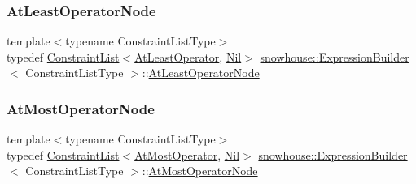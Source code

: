 \mbox{\label{structsnowhouse_1_1ExpressionBuilder_aaf839b9ebd0daa72220cc48bfaaea83f}} 
\subsubsection{\texorpdfstring{AtLeastOperatorNode}{AtLeastOperatorNode}}
{\footnotesize\ttfamily template$<$typename Constraint\+List\+Type$>$ \\
typedef \mbox{\hyperlink{structsnowhouse_1_1ConstraintList}{Constraint\+List}}$<$\mbox{\hyperlink{structsnowhouse_1_1AtLeastOperator}{At\+Least\+Operator}}, \mbox{\hyperlink{structsnowhouse_1_1Nil}{Nil}}$>$ \mbox{\hyperlink{structsnowhouse_1_1ExpressionBuilder}{snowhouse\+::\+Expression\+Builder}}$<$ Constraint\+List\+Type $>$\+::\mbox{\hyperlink{structsnowhouse_1_1ExpressionBuilder_aaf839b9ebd0daa72220cc48bfaaea83f}{At\+Least\+Operator\+Node}}}

\mbox{\label{structsnowhouse_1_1ExpressionBuilder_a41e14d33809a425326ef459325569442}} 
\subsubsection{\texorpdfstring{AtMostOperatorNode}{AtMostOperatorNode}}
{\footnotesize\ttfamily template$<$typename Constraint\+List\+Type$>$ \\
typedef \mbox{\hyperlink{structsnowhouse_1_1ConstraintList}{Constraint\+List}}$<$\mbox{\hyperlink{structsnowhouse_1_1AtMostOperator}{At\+Most\+Operator}}, \mbox{\hyperlink{structsnowhouse_1_1Nil}{Nil}}$>$ \mbox{\hyperlink{structsnowhouse_1_1ExpressionBuilder}{snowhouse\+::\+Expression\+Builder}}$<$ Constraint\+List\+Type $>$\+::\mbox{\hyperlink{structsnowhouse_1_1ExpressionBuilder_a41e14d33809a425326ef459325569442}{At\+Most\+Operator\+Node}}}

